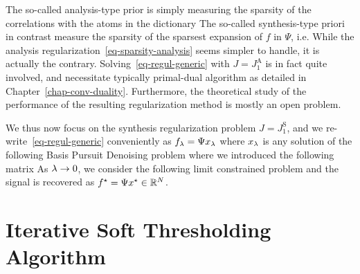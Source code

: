The so-called analysis-type prior is simply measuring the sparsity of the correlations with the atoms in the dictionary
The so-called synthesis-type priori in contrast measure the sparsity of the sparsest expansion of $f$ in $\Psi$, i.e.
While the analysis regularization~\eqref{eq-sparsity-analysis} seems simpler to handle, it is actually the contrary. Solving~\eqref{eq-regul-generic} with $J=J_1^{\text{A}}$ is in fact quite involved, and necessitate typically primal-dual algorithm as detailed in Chapter~\ref{chap-conv-duality}. Furthermore, the theoretical study of the performance of the resulting regularization method is mostly an open problem. 

We thus now focus on the synthesis regularization problem $J=J_1^{\text{S}}$, and we re-write~\eqref{eq-regul-generic} conveniently as $f_\lambda = \Psi x_\lambda$ where $x_\lambda$ is any solution of the following Basis Pursuit Denoising problem
where we introduced the following matrix
As $\lambda \rightarrow 0$, we consider the following limit constrained problem
and the signal is recovered as $f^\star=\Psi x^\star \in \mathbb{R}^N$.





 
\section{Iterative Soft Thresholding Algorithm}
\label{subsec-proximal-ip}

